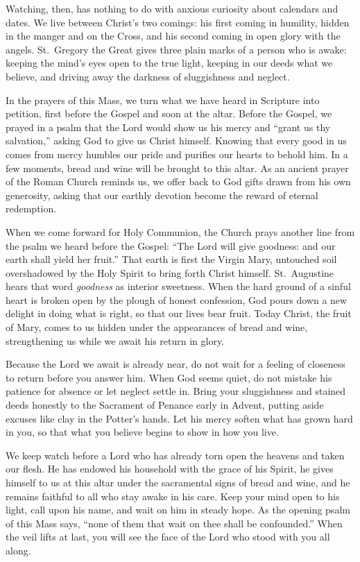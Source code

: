 Watching, then, has nothing to do with anxious curiosity about calendars and dates. We live between Christ's two comings: his first coming in humility, hidden in the manger and on the Cross, and his second coming in open glory with the angels. St.~Gregory the Great gives three plain marks of a person who is awake: keeping the mind's eyes open to the true light, keeping in our deeds what we believe, and driving away the darkness of sluggishness and neglect.

In the prayers of this Mass, we turn what we have heard in Scripture into petition, first before the Gospel and soon at the altar. Before the Gospel, we prayed in a psalm that the Lord would show us his mercy and ``grant us thy salvation,'' asking God to give us Christ himself. Knowing that every good in us comes from mercy humbles our pride and purifies our hearts to behold him. In a few moments, bread and wine will be brought to this altar. As an ancient prayer of the Roman Church reminds us, we offer back to God gifts drawn from his own generosity, asking that our earthly devotion become the reward of eternal redemption.

When we come forward for Holy Communion, the Church prays another line from the psalm we heard before the Gospel: ``The Lord will give goodness: and our earth shall yield her fruit.'' That earth is first the Virgin Mary, untouched soil overshadowed by the Holy Spirit to bring forth Christ himself. St.~Augustine hears that word \emph{goodness} as interior sweetness. When the hard ground of a sinful heart is broken open by the plough of honest confession, God pours down a new delight in doing what is right, so that our lives bear fruit. Today Christ, the fruit of Mary, comes to us hidden under the appearances of bread and wine, strengthening us while we await his return in glory.

Because the Lord we await is already near, do not wait for a feeling of closeness to return before you answer him. When God seems quiet, do not mistake his patience for absence or let neglect settle in. Bring your sluggishness and stained deeds honestly to the Sacrament of Penance early in Advent, putting aside excuses like clay in the Potter's hands. Let his mercy soften what has grown hard in you, so that what you believe begins to show in how you live.

We keep watch before a Lord who has already torn open the heavens and taken our flesh. He has endowed his household with the grace of his Spirit, he gives himself to us at this altar under the sacramental signs of bread and wine, and he remains faithful to all who stay awake in his care. Keep your mind open to his light, call upon his name, and wait on him in steady hope. As the opening psalm of this Mass says, ``none of them that wait on thee shall be confounded.'' When the veil lifts at last, you will see the face of the Lord who stood with you all along.

